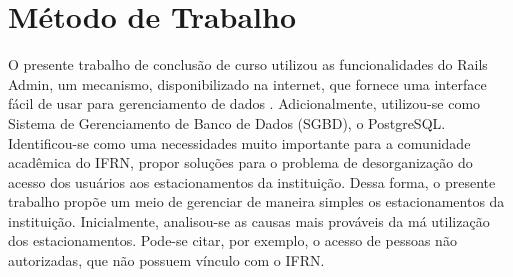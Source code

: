 





\section{Método de Trabalho}
\label{MétodoTrabalho}
O presente trabalho de conclusão de curso utilizou as funcionalidades do Rails Admin, 
um mecanismo, disponibilizado na internet, que fornece uma interface fácil de usar para gerenciamento de dados \cite{adminGitHub2018}. Adicionalmente, utilizou-se como Sistema de Gerenciamento de Banco de Dados (SGBD), o PostgreSQL. Identificou-se como uma necessidades muito importante para a comunidade acadêmica do IFRN, propor soluções para o problema de desorganização do acesso dos usuários aos estacionamentos da instituição. Dessa forma, o presente trabalho propõe um meio de gerenciar de maneira simples os estacionamentos da instituição. 
Inicialmente, analisou-se as causas mais prováveis da má utilização dos estacionamentos. Pode-se citar, por exemplo, o acesso de pessoas não autorizadas, que não possuem vínculo com o IFRN.

